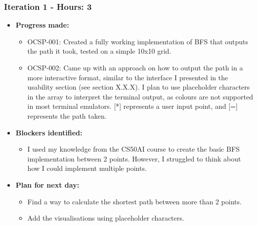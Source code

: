 \subsubsection{Iteration 1 - Hours: 3}
\begin{itemize}
    \item \textbf{Progress made:}
    \begin{itemize}
        \item OCSP-001: Created a fully working implementation of BFS that outputs the path it took, tested on a simple 10x10 grid.
        \item OCSP-002: Came up with an approach on how to output the path in a more interactive format, similar to the interface I presented in the usability section (see section X.X.X). I plan to use placeholder characters in the array to interpret the terminal output, as colours are not supported in most terminal emulators. [*] represents a user input point, and [=] represents the path taken.
    \end{itemize}
    \item \textbf{Blockers identified:}
    \begin{itemize}
        \item I used my knowledge from the CS50AI course to create the basic BFS implementation between 2 points. However, I struggled to think about how I could implement multiple points.

    \end{itemize}
    \item \textbf{Plan for next day:}
    \begin{itemize}
        \item Find a way to calculate the shortest path between more than 2 points.
        \item Add the visualisations using placeholder characters.
    \end{itemize}
\end{itemize}

